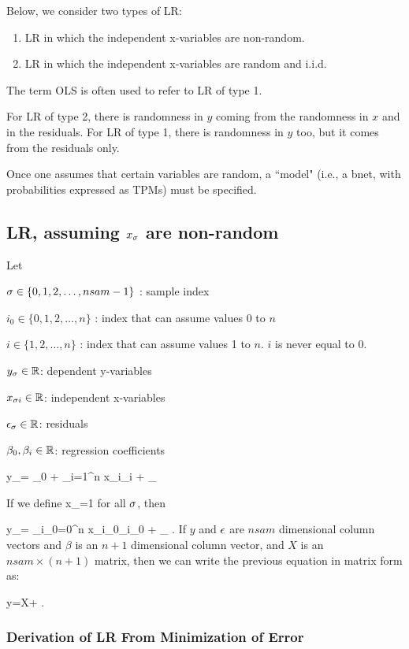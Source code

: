 Below, we consider two types of LR:

\begin{enumerate}
\item
LR
in which the independent x-variables are non-random.
\item
LR
in which the independent x-variables are random
and i.i.d.
\end{enumerate}

The  term OLS
is often used to refer to LR
of type 1.



For LR of type 2,
there is randomness in $y$
coming from the randomness in $x$
and in the residuals.
For LR of type 1,
there  is randomness in $y$
too, but
it comes
from the residuals
only.

Once one assumes that certain
variables are random, a
``model" (i.e., a bnet,
with probabilities expressed as TPMs)
 must be
specified.


\subsection{LR, assuming
$x_\sigma$ are non-random}

Let

$\sigma\in\{0, 1, 2, \ldots, nsam-1\}$ : sample index

$i_0\in\{0, 1, 2, \ldots, n\}$ :
index that can assume values 0 to $n$

$i\in\{1, 2, \ldots, n\}$ :
index that can assume values 1 to $n$.
$i$ is never equal to 0.


$y_\sigma\in { \mathbb{R}}$: dependent y-variables

$x_{\sigma i}\in { \mathbb{R}}$: independent x-variables

$\epsilon_\sigma\in { \mathbb{R}}$: residuals

$\beta_0, \beta_i\in { \mathbb{R}}$:
regression coefficients


\beq
y_\s= \beta_0 +
\sum_{i=1}^{n} x_{\s i}\beta_{i} + \eps_\s
\label{eq-LR-start}
\eeq

If we define
\beq
x_{}=1
\;
\eeq
for all $\sigma$, then

\beq
y_\s=
\sum_{i_0=0}^{n} x_{\s i_0}\beta_{i_0} + \eps_\s
\;.
\eeq
If $y$ and $\epsilon$ are $nsam$ dimensional
 column vectors and $\beta$
is an $n+1$ dimensional column vector,
and $X$ is an $nsam\times (n+1)$ matrix,
then we can write the previous equation in matrix
form as:


\beq
y=X\beta+\eps
\;.
\eeq

\subsubsection{Derivation of LR
 From Minimization of Error}

